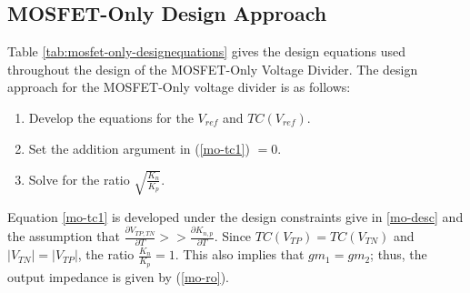 \documentclass[conference]{IEEEtran}
\begin{document}
\subsection{MOSFET-Only Design Approach}
Table \ref{tab:mosfet-only-designequations} gives the design equations used throughout the design of the MOSFET-Only Voltage Divider.  The design approach for the MOSFET-Only voltage divider is as follows:
\begin{enumerate}
  \item Develop the equations for the $V_{ref}$ and $TC(V_{ref})$.
  \item Set the addition argument in (\ref{mo-tc1}) $=0$.
  \item Solve for the ratio $\sqrt{\frac{K_n}{K_p}}$.
\end{enumerate}

Equation \ref{mo-tc1} is developed under the design constraints give in \ref{mo-desc} and the assumption that $\frac{\partial{V_{TP,TN}}}{\partial{T}} >> \frac{\partial{K_{n,p}}}{\partial{T}}$.  Since $TC(V_{TP})=TC(V_{TN})$ and $|{V_{TN}}|=|V_{TP}|$, the ratio $\frac{K_n}{K_p} = 1$.  This also implies that $gm_1=gm_2$; thus, the output impedance is given by (\ref{mo-ro}).
\end{document}

